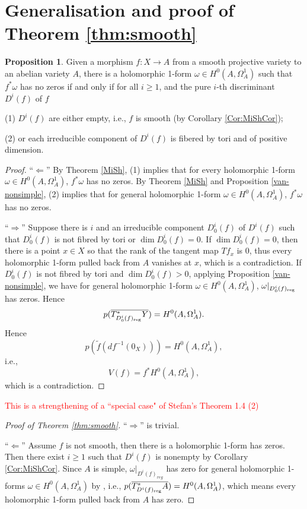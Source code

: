 \documentclass[a4paper,12pt,reqno]{amsart}
\theoremstyle{plain}
\theoremstyle{definition}
\newtheorem{proposition}[theorem]{Proposition}
\theoremstyle{remark}
\newcommand{\sorry}[1]{\textcolor{red}{#1}}
\begin{document}
\section{Generalisation and proof of Theorem \ref{thm:smooth}}


\begin{proposition}
Given a morphism $f\colon X\to A$ from a smooth 
projective variety to an abelian variety $A$, there is a holomorphic 1-form $\omega\in H^0(A, \Omega_A^1)$ such that $f^*\omega$ has no zeros if and only
if for all $i\geq1$, and the pure $i$-th discriminant $D^i(f)$ of $f$

(1) $D^i(f)$ are either empty, i.e., $f$ is smooth (by Corollary \ref{Cor:MiShCor});

(2) or each irreducible component of $D^i(f)$ is fibered by tori and of positive dimension. 
\label{thm:nonvanishing}
\end{proposition}

\begin{proof} ``$\Leftarrow$'' By Theorem \ref{MiSh}, (1) implies that for every holomorphic 1-form $\omega\in H^0(A, \Omega_A^1)$, $f^*\omega$ has no zeros. By Theorem \ref{MiSh} and Proposition \ref{van-nonsimple}, (2) implies that for general holomorphic 1-form $\omega\in H^0(A, \Omega_A^1)$, $f^*\omega$ has no zeros.


``$\Rightarrow$'' 
Suppose there is $i$ and an irreducible component $D_0^i(f)$ of $D^i(f)$ such that $D_0^i(f)$ is not fibred by tori or $\dim D_0^i(f)=0$. If $\dim D^i_0(f)=0$, then there is a point $x\in X$ so that the rank of the tangent map $Tf_x$ is 0, thus every holomorphic 1-form pulled back from $A$ vanishes at $x$, which is a contradiction. If $D_0^i(f)$ is not fibred by tori and $\dim D_0^i(f)>0$, applying Proposition \ref{van-nonsimple}, we have for general holomorphic 1-form $\omega\in H^0(A, \Omega_A^1)$, $\omega|_{D_0^i(f)_{\textnormal{reg}}}$ has zeros. Hence $$p(\overline{T^*_{D_0^i(f)_{\textnormal{reg}}}Y})=H^0(A, \Omega_A^1).$$ Hence $$p(\tilde{f}(df^{-1}(0_X)))=H^0(A, \Omega_A^1),$$ i.e.,$$V(f)=f^*H^0(A, \Omega_A^1),$$ which is a contradiction.
\end{proof}

\sorry{This is a strengthening of a ``special case" of Stefan's Theorem 1.4 (2)}



\begin{proof}[Proof of Theorem \ref{thm:smooth}]
``$\Rightarrow$'' is trivial.

``$\Leftarrow$'' Assume $f$ is not smooth, then there is a holomorphic 1-form has zeros. Then there exist $i\geq 1$ such that $D^i(f)$ is nonempty by Corollary \ref{Cor:MiShCor}. Since $A$ is simple, $\omega|_{D^i(f)_{reg}}$ has zero for general holomorphic 1-forms $\omega\in H^0(A, \Omega_A^1)$ by \cite[Proposition 3.1]{HK05}, i.e.,  $p(\overline{T^*_{D^i(f)_{\textnormal{reg}}}A})=H^0(A, \Omega_A^1)$, which means every holomorphic 1-form pulled back from $A$ has zero.
\end{proof}
\end{document}
